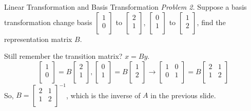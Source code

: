 \documentclass{beamer}
\begin{document}
\begin{frame}{Linear Transformation and Basis Transformation}
\emph{Problem 2.} Suppose a basis transformation change basis $\left[ \begin{array}{c}
        1\\
        0\\
    \end{array} \right]$ to $\left[ \begin{array}{c}
        2\\
        1\\
    \end{array} \right]$, $\left[ \begin{array}{c}
        0\\
        1\\
    \end{array} \right]$ to $\left[ \begin{array}{c}
        1\\
        2\\
    \end{array} \right]$, find the representation matrix $B$.

    \vspace{3pt}
Still remember the transition matrix? $x=By$.
\begin{equation*}
    \left[ \begin{array}{c}
        1\\
        0\\
    \end{array} \right] =B\left[ \begin{array}{c}
        2\\
        1\\
    \end{array} \right] ,\left[ \begin{array}{c}
        0\\
        1\\
    \end{array} \right] =B\left[ \begin{array}{c}
        1\\
        2\\
    \end{array} \right] \rightarrow \left[ \begin{matrix}
        1&		0\\
        0&		1\\
    \end{matrix} \right] =B\left[ \begin{matrix}
        2&		1\\
        1&		2\\
    \end{matrix} \right]
\end{equation*}
So, $B=\left[ \begin{matrix}
    2&		1\\
    1&		2\\
\end{matrix} \right]^{-1}$, which is the inverse of $A$ in the previous slide.


\end{frame}
\end{document}
